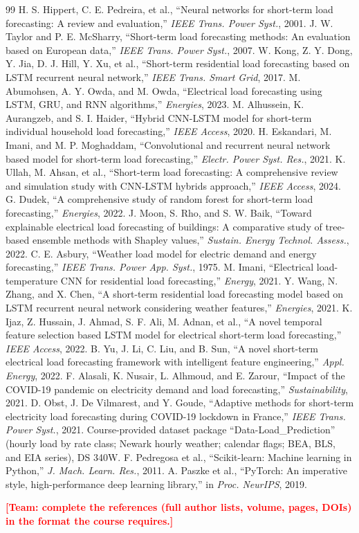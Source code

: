 \documentclass[conference]{IEEEtran}
\newcommand{\todo}[1]{\textcolor{red}{\textbf{[Team: #1]}}}
\begin{document}
\begin{thebibliography}{99}
 H. S. Hippert, C. E. Pedreira, et al., ``Neural networks for short-term load forecasting: A review and evaluation,'' \textit{IEEE Trans. Power Syst.}, 2001.
 J. W. Taylor and P. E. McSharry, ``Short-term load forecasting methods: An evaluation based on European data,'' \textit{IEEE Trans. Power Syst.}, 2007.
 W. Kong, Z. Y. Dong, Y. Jia, D. J. Hill, Y. Xu, et al., ``Short-term residential load forecasting based on LSTM recurrent neural network,'' \textit{IEEE Trans. Smart Grid}, 2017.
 M. Abumohsen, A. Y. Owda, and M. Owda, ``Electrical load forecasting using LSTM, GRU, and RNN algorithms,'' \textit{Energies}, 2023.
 M. Alhussein, K. Aurangzeb, and S. I. Haider, ``Hybrid CNN-LSTM model for short-term individual household load forecasting,'' \textit{IEEE Access}, 2020.
 H. Eskandari, M. Imani, and M. P. Moghaddam, ``Convolutional and recurrent neural network based model for short-term load forecasting,'' \textit{Electr. Power Syst. Res.}, 2021.
 K. Ullah, M. Ahsan, et al., ``Short-term load forecasting: A comprehensive review and simulation study with CNN-LSTM hybrids approach,'' \textit{IEEE Access}, 2024.
 G. Dudek, ``A comprehensive study of random forest for short-term load forecasting,'' \textit{Energies}, 2022.
 J. Moon, S. Rho, and S. W. Baik, ``Toward explainable electrical load forecasting of buildings: A comparative study of tree-based ensemble methods with Shapley values,'' \textit{Sustain. Energy Technol. Assess.}, 2022.
 C. E. Asbury, ``Weather load model for electric demand and energy forecasting,'' \textit{IEEE Trans. Power App. Syst.}, 1975.
 M. Imani, ``Electrical load-temperature CNN for residential load forecasting,'' \textit{Energy}, 2021.
 Y. Wang, N. Zhang, and X. Chen, ``A short-term residential load forecasting model based on LSTM recurrent neural network considering weather features,'' \textit{Energies}, 2021.
 K. Ijaz, Z. Hussain, J. Ahmad, S. F. Ali, M. Adnan, et al., ``A novel temporal feature selection based LSTM model for electrical short-term load forecasting,'' \textit{IEEE Access}, 2022.
 B. Yu, J. Li, C. Liu, and B. Sun, ``A novel short-term electrical load forecasting framework with intelligent feature engineering,'' \textit{Appl. Energy}, 2022.
 F. Alasali, K. Nusair, L. Alhmoud, and E. Zarour, ``Impact of the COVID-19 pandemic on electricity demand and load forecasting,'' \textit{Sustainability}, 2021.
 D. Obst, J. De Vilmarest, and Y. Goude, ``Adaptive methods for short-term electricity load forecasting during COVID-19 lockdown in France,'' \textit{IEEE Trans. Power Syst.}, 2021.
 Course-provided dataset package ``Data-Load\_Prediction'' (hourly load by rate class; Newark hourly weather; calendar flags; BEA, BLS, and EIA series), DS 340W.
 F. Pedregosa et al., ``Scikit-learn: Machine learning in Python,'' \textit{J. Mach. Learn. Res.}, 2011.
 A. Paszke et al., ``PyTorch: An imperative style, high-performance deep learning library,'' in \textit{Proc. NeurIPS}, 2019.
\end{thebibliography}
\todo{complete the references (full author lists, volume, pages, DOIs) in the format the course requires.}
\end{document}
